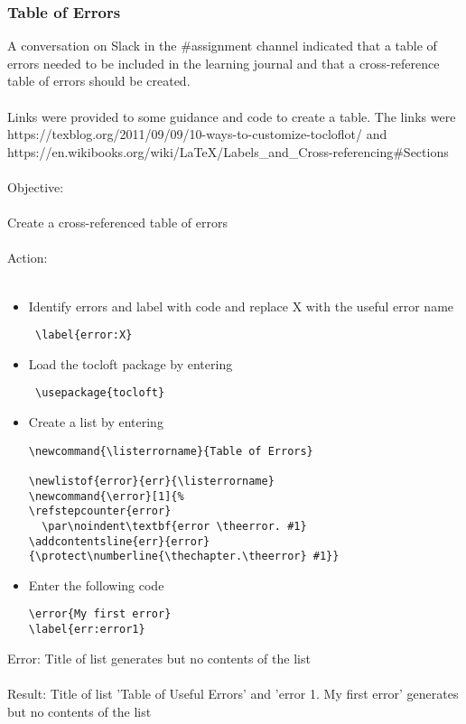\documentclass{article}
\newcommand{\listerrorname}{Table of Useful Errors}
\newcommand{\error}[1]{%
\refstepcounter{error}
  \par\noindent\textbf{error \theerror. #1}
\addcontentsline{err}{error}
{\protect\numberline{\thechapter.\theerror} #1}}
\begin{document}
\subsubsection*{Table of Errors}
A conversation on Slack in the \#assignment channel indicated that a table of errors needed to be included in the learning journal and that a cross-reference table of errors should be created.\\\\
Links were provided to some guidance and code to create a table. The links were https://texblog.org/2011/09/09/10-ways-to-customize-tocloflot/ and https://en.wikibooks.org/wiki/LaTeX/Labels_and_Cross-referencing#Sections\\\\
Objective:\\\\
Create a cross-referenced table of errors\\\\
Action:\\\\
\begin{itemize}
    \item Identify errors and label with code and replace X with the useful error name \begin{verbatim} \label{error:X}    \end{verbatim} 
    \item Load the tocloft package by entering \begin{verbatim} \usepackage{tocloft}\end{verbatim} 
    \item Create a list by entering \begin{verbatim}\newcommand{\listerrorname}{Table of Errors}

\newlistof{error}{err}{\listerrorname}
\newcommand{\error}[1]{%
\refstepcounter{error}
  \par\noindent\textbf{error \theerror. #1}
\addcontentsline{err}{error}
{\protect\numberline{\thechapter.\theerror} #1}}\end{verbatim} 
\item Enter the following code \begin{verbatim}
\error{My first error}
\label{err:error1}
\end{verbatim} 
\end{itemize}

Error: Title of list generates but no contents of the list\\\\
Result: Title of list 'Table of Useful Errors' and 'error 1. My first error' generates but no contents of the list\\\\
\end{document}
